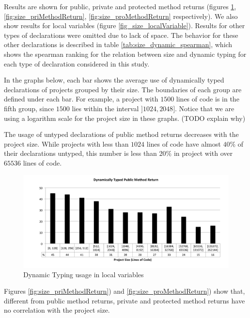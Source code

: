 \documentclass[preprint]{sigplanconf}
\begin{document}
Results are shown for public, private and protected method returns (figures \ref{fig:size_pubMethodReturn}, \ref{fig:size_priMethodReturn}, \ref{fig:size_proMethodReturn} respectively). 
We also show results for local variables (figure \ref{fig_size_localVariable}). 
Results for other types of declarations were omitted due to lack of space.
The behavior for these other declarations is described in table \ref{tab:size_dynamic_spearman}, which shows the spearman ranking for the relation between size and dynamic typing for each type of declaration considered in this study.

In the graphs below, each bar shows the average use of dynamically typed declarations of projects grouped by their size.
The boundaries of each group are defined under each bar.
For example, a project with $1500$ lines of code is in the fifth group, since $1500$ lies within the interval $]1024, 2048]$.
Notice that we are using a logarithm scale for the project size in these graphs. (TODO explain why)

The usage of untyped declarations of public method returns decreases with the project size.
While projects with less than $1024$ lines of code have almost $40\%$ of their declarations untyped, this number is less than $20\%$ in project with over $65536$ lines of code.

\begin{figure}[ht]
\centering 
\includegraphics[width=1\textwidth]{images/size_pubMethodReturn} 
\caption{Dynamic Typing usage in local variables}
\label{fig:size_pubMethodReturn} 
\end{figure}

Figures \ref{fig:size_priMethodReturn}) and \ref{fig:size_proMethodReturn}) show that, different from public method returns, private and protected method returns have no correlation with the project size.
\end{document}
